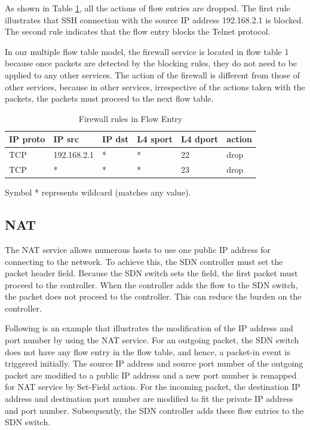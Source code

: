 \documentclass[conference]{IEEEtran}
\begin{document}
As shown in Table \ref{table:fw}, all the actions of flow entries are dropped. The first rule illustrates that SSH connection with the source IP address 192.168.2.1 is blocked. The second rule indicates that the flow entry blocks the Telnet protocol.

In our multiple flow table model, the firewall service is located in flow table 1 because once packets are detected by the blocking rules, they do not need to be applied to any other services.
The action of the firewall is different from those of other services, because in other services, irrespective of the actions taken with the packets, the packets must proceed to the next flow table.

\begin{table}[!t]
\caption{Firewall rules in Flow Entry}
\label{table:fw}
\centering
\begin{threeparttable}
\begin{tabular}{|l|l|l|l|l|l|}
\hline
IP proto & IP src      & IP dst       & L4 sport & L4 dport & action \\ \hline
TCP      & 192.168.2.1 & *            & *        & 22       & drop   \\ \hline
TCP      & *           & *            & *        & 23       & drop   \\ \hline
\end{tabular}
  \begin{tablenotes}
    \item[] Symbol * represents wildcard (matches any value).
  \end{tablenotes}
\end{threeparttable}
\end{table}



\subsection{NAT}
The NAT service allows numerous hosts to use one public IP address for connecting to the network.
To achieve this, the SDN controller must set the packet header field.
Because the SDN switch sets the field, the first packet must proceed to the controller.
When the controller adds the flow to the SDN switch, the packet does not proceed to the controller.
This can reduce the burden on the controller.

Following is an example that illustrates the modification of the IP address and port number by using the NAT service.
For an outgoing packet, the SDN switch does not have any flow entry in the flow table, and hence, a packet-in event is triggered initially.
The source IP address and source port number of the outgoing packet are modified to a public IP address and a new port number is remapped for NAT service by Set-Field action.
For the incoming packet, the destination IP address and destination port number are modified to fit the private IP address and port number.
Subsequently, the SDN controller adds these flow entries to the SDN switch.
\end{document}
